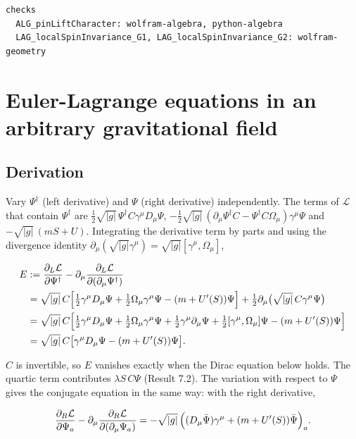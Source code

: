 \documentclass[11pt]{article}
\begin{document}
\begin{Verbatim}[fontsize=\small]
checks
  ALG_pinLiftCharacter: wolfram-algebra, python-algebra
  LAG_localSpinInvariance_G1, LAG_localSpinInvariance_G2: wolfram-geometry
\end{Verbatim}

\section{Euler-Lagrange equations in an arbitrary gravitational field}

\subsection{Derivation}

Vary $\Psi^\dagger$ (left derivative) and $\Psi$ (right derivative) independently. The terms of $\mathcal L$ that contain $\Psi^\dagger$ are $\tfrac12\sqrt{|g|}\,\Psi^\dagger C\gamma^\mu D_\mu\Psi$, $-\tfrac12\sqrt{|g|}\,(\partial_\mu\Psi^\dagger C-\Psi^\dagger C\Omega_\mu)\gamma^\mu\Psi$ and $-\sqrt{|g|}\,(mS+U)$. Integrating the derivative term by parts and using the divergence identity $\partial_\mu(\sqrt{|g|}\gamma^\mu)=\sqrt{|g|}[\gamma^\mu,\Omega_\mu]$,

\[
\begin{aligned}
E&:=\frac{\partial_L\mathcal L}{\partial\Psi^\dagger}-\partial_\mu\frac{\partial_L\mathcal L}{\partial(\partial_\mu\Psi^\dagger)}\\
&=\sqrt{|g|}\,C\Bigl[\tfrac12\gamma^\mu D_\mu\Psi+\tfrac12\Omega_\mu\gamma^\mu\Psi-(m+U'(S))\Psi\Bigr]+\tfrac12\partial_\mu\bigl(\sqrt{|g|}\,C\gamma^\mu\Psi\bigr)\\
&=\sqrt{|g|}\,C\Bigl[\tfrac12\gamma^\mu D_\mu\Psi+\tfrac12\Omega_\mu\gamma^\mu\Psi+\tfrac12\gamma^\mu\partial_\mu\Psi+\tfrac12[\gamma^\mu,\Omega_\mu]\Psi-(m+U'(S))\Psi\Bigr]\\
&=\sqrt{|g|}\,C\bigl[\gamma^\mu D_\mu\Psi-(m+U'(S))\Psi\bigr].
\end{aligned}
\]

$C$ is invertible, so $E$ vanishes exactly when the Dirac equation below holds. The quartic term contributes $\lambda S\,C\Psi$ (Result 7.2). The variation with respect to $\Psi$ gives the conjugate equation in the same way: with the right derivative,

\[
\frac{\partial_R\mathcal L}{\partial\Psi_a}-\partial_\mu\frac{\partial_R\mathcal L}{\partial(\partial_\mu\Psi_a)}=-\sqrt{|g|}\,\Bigl((D_\mu\bar\Psi)\gamma^\mu+(m+U'(S))\bar\Psi\Bigr)_a .
\]
\end{document}
